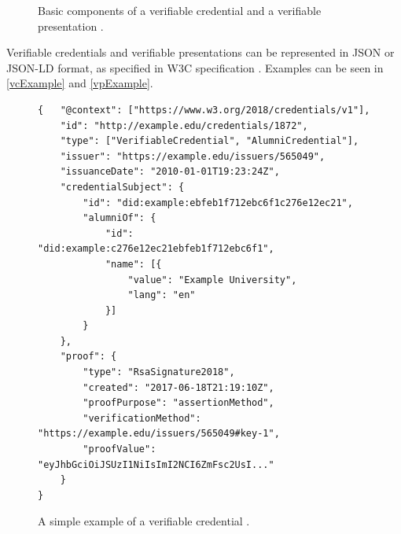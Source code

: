 \begin{figure}[h!]
    \centering
     
    \hfil
    
    \caption{Basic components of a verifiable credential and a verifiable presentation \cite{vcW3C}.}
    \label{vc-vp-topview}
\end{figure}

Verifiable credentials and verifiable presentations can be represented in JSON \cite{json-rfc3986} or JSON-LD \cite{json-ld} format, as specified in W3C specification \cite{vcW3C}. Examples can be seen in \autoref{vcExample} and \autoref{vpExample}. \\

\begin{figure}[h!]
\begin{lstlisting}[style=json, breaklines=true,frame=single]
{   "@context": ["https://www.w3.org/2018/credentials/v1"],
    "id": "http://example.edu/credentials/1872",
    "type": ["VerifiableCredential", "AlumniCredential"],
    "issuer": "https://example.edu/issuers/565049",
    "issuanceDate": "2010-01-01T19:23:24Z",
    "credentialSubject": {
        "id": "did:example:ebfeb1f712ebc6f1c276e12ec21",
        "alumniOf": {
            "id": "did:example:c276e12ec21ebfeb1f712ebc6f1",
            "name": [{
                "value": "Example University",
                "lang": "en"
            }]
        }
    },    
    "proof": {
        "type": "RsaSignature2018",
        "created": "2017-06-18T21:19:10Z",
        "proofPurpose": "assertionMethod",
        "verificationMethod": "https://example.edu/issuers/565049#key-1",
        "proofValue": "eyJhbGciOiJSUzI1NiIsImI2NCI6ZmFsc2UsI..."
    }
}
\end{lstlisting}
\caption{A simple example of a verifiable credential \cite{vcW3C}. \label{vcExample}}
\end{figure}



